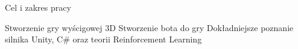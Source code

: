 \begin{frame}{Cel i zakres pracy}

	\begin{itemize}
		\myitem Stworzenie gry wyścigowej 3D
		\myitem Stworzenie bota do gry
		\myitem Dokładniejsze poznanie silnika Unity, C\# oraz teorii Reinforcement Learning
	\end{itemize}

\end{frame}
